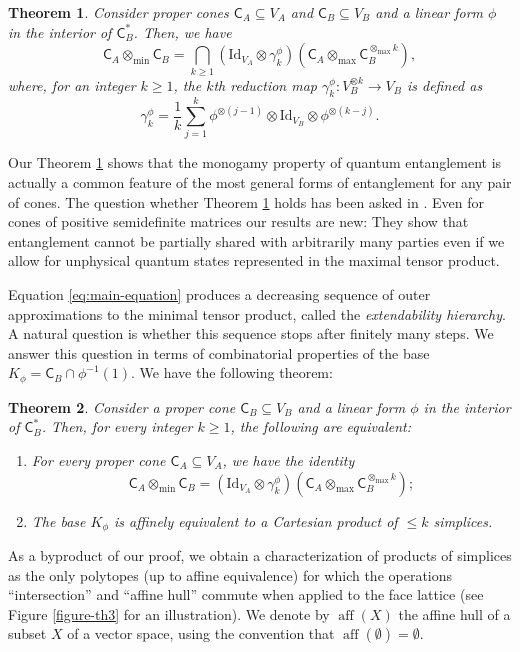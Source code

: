 \documentclass{amsart}
\renewcommand{\leq}{\leqslant}
\renewcommand{\geq}{\geqslant}
\renewcommand{\subset}{\subseteq}
\newcommand{\gC}{\mathsf{C}}
\DeclareMathOperator{\aff}{\mathrm{aff}}
\newcommand{\Id}{\mathrm{Id}}
\theoremstyle{plain}
\newtheorem{theorem}{Theorem}
\newcommand{\tmin}{{\otimes_{\min}}}
\newcommand{\tmax}{{\otimes_{\max}}}
\begin{document}
\begin{theorem}\label{thm:Main1}
Consider proper cones $\gC_A\subset V_A$ and $\gC_B\subset V_B$ and a linear form $\phi$ in the interior of $\gC_B^*$. Then, we have
\begin{equation} \label{eq:main-equation}
\gC_A \tmin \gC_B = \bigcap_{ k \geq 1}  \left( \Id_{V_A} \otimes \gamma_k^\phi \right) \left(\gC_A \tmax \gC_B^{\tmax k} \right),
\end{equation}
where, for an integer $k \geq 1$, the \emph{$k$th reduction map} $\gamma_k^\phi : V_B^{\otimes k} \to V_B$ is defined as
\[ \gamma_k^\phi = \frac{1}{k} \sum_{j=1}^k  \phi^{\otimes (j-1)} \otimes \Id_{V_B} \otimes \phi^{\otimes (k-j)}. \]
\end{theorem}
Our Theorem \ref{thm:Main1} shows that the monogamy property of quantum entanglement is actually a common feature of the most general forms of entanglement for any pair of cones. The question whether Theorem \ref{thm:Main1} holds has been asked in \cite[\S 2.4.1]{lamiatesi}. Even for cones of positive semidefinite matrices our results are new: They show that entanglement cannot be partially shared with arbitrarily many parties even if we allow for unphysical quantum states represented in the maximal tensor product. 

Equation \eqref{eq:main-equation} produces a decreasing sequence of outer approximations to the minimal tensor product, called the \emph{extendability hierarchy}. A natural question is whether this sequence stops after finitely many steps. We answer this question in terms of combinatorial properties of the base $K_\phi = \gC_B \cap \phi^{-1}(1)$. We have the following theorem:

\begin{theorem}\label{thm:Main2}
Consider a proper cone $\gC_B\subset V_B$ and a linear form $\phi$ in the interior of $\gC_B^*$. Then, for every integer $k \geq 1$, the following are equivalent:
\begin{enumerate}
    \item[(i)] For every proper cone $\gC_A\subset V_A$, we have the identity
    \[ \gC_A \tmin \gC_B =  \left( \Id_{V_A} \otimes \gamma_k^\phi \right) \left(\gC_A \tmax \gC_B^{\tmax k} \right) ;\]
    \item[(ii)] The base $K_\phi$ is affinely equivalent to a Cartesian product of $\leq k$ simplices.
\end{enumerate}
\end{theorem}

As a byproduct of our proof, we obtain a characterization of products of simplices as the only polytopes (up to affine equivalence) for which the operations ``intersection'' and ``affine hull'' commute when applied to the face lattice (see Figure \ref{figure-th3} for an illustration). We denote by $\aff(X)$ the affine hull of a subset $X$ of a vector space, using the convention that $\aff(\emptyset)=\emptyset$.
  
\end{document}
